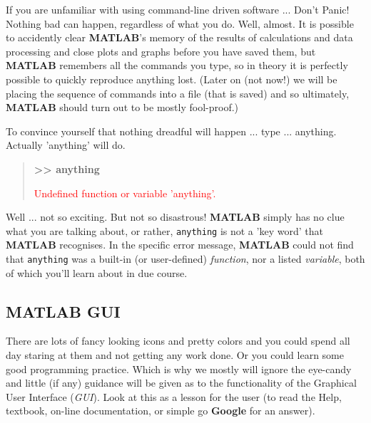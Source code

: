 \documentclass{tufte-book} %
\newenvironment{docspec}{\begin{quotation}\ttfamily\parskip0pt\parindent0pt\ignorespaces}{\end{quotation}}
\begin{document}
If you are unfamiliar with using command-line driven software ... Don't Panic!\cite{Adams1979} Nothing bad can happen, regardless of what you do. Well, almost. It is possible to accidently clear \textbf{MATLAB}'s memory of the results of calculations and data processing and close plots and graphs before you have saved them, but \textbf{MATLAB} remembers all the commands you type, so in theory it is perfectly possible to quickly reproduce anything lost. (Later on (not now!) we will be placing the sequence of commands into a file (that is saved) and so ultimately, \textbf{MATLAB} should turn out to be mostly fool-proof.)

To convince yourself that nothing dreadful will happen ... type ... anything. Actually 'anything' will do.

\begin{docspec}
\textbf{>> anything}

\textcolor{red}{Undefined function or variable 'anything'.}
\end{docspec}

Well ... not so exciting. But not so disastrous! \textbf{MATLAB} simply has no clue what you are talking about, or rather, \texttt{anything} is not a 'key word' that \textbf{MATLAB} recognises. In the specific error message, \textbf{MATLAB} could not find that \texttt{anything} was a built-in (or user-defined) \textit{function}, nor a listed \textit{variable}, both of which you'll learn about in due course.

%
\newpage 


\subsection{MATLAB GUI}

There are lots of fancy looking icons and pretty colors and you could spend all day staring at them and not getting any work done. Or you could learn some good programming practice. Which is why we mostly will ignore the eye-candy and little (if any) guidance will be given as to the functionality of the Graphical User Interface (\textit{GUI}). Look at this as a lesson for the user (to read the \textsf{Help}, textbook, on-line documentation, or simple go \textbf{Google} for an answer).
\end{document}
